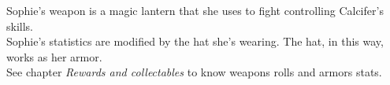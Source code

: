 Sophie's weapon is a magic lantern that she uses to fight controlling Calcifer's skills. \\
Sophie's statistics are modified by the hat she's wearing. The hat, in this way, works as her armor.\\
See chapter \textit{Rewards and collectables} to know weapons rolls and armors stats.
